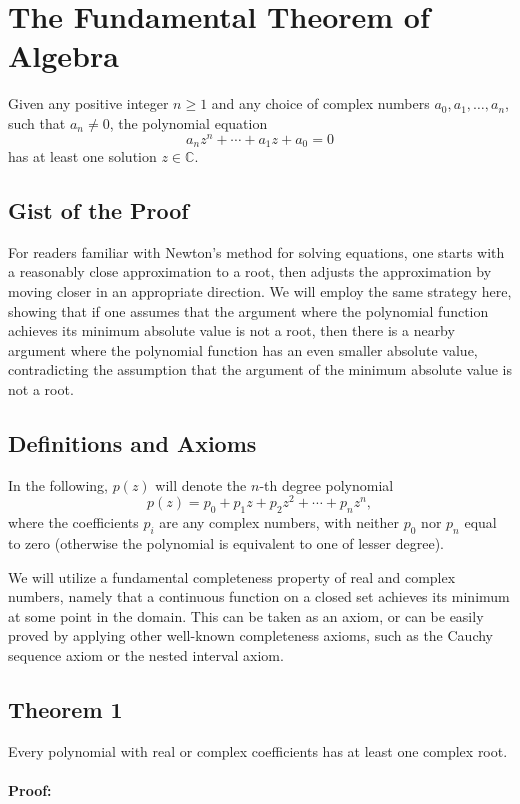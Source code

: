 \newpage
\section{The Fundamental Theorem of Algebra}

Given any positive integer \(n \geq 1\) and any choice of complex numbers \(a_0, a_1, \ldots, a_n\), such that \(a_n \neq 0\), the polynomial equation
\[
	a_n z^n + \cdots + a_1 z + a_0 = 0 \tag{1}
\]
has at least one solution \(z \in \mathbb{C}\).

\subsection*{Gist of the Proof}

For readers familiar with Newton’s method for solving equations, one starts with a reasonably close approximation to a root, then adjusts the approximation by moving closer in an appropriate direction. We will employ the same strategy here, showing that if one assumes that the argument where the polynomial function achieves its minimum absolute value is not a root, then there is a nearby argument where the polynomial function has an even smaller absolute value, contradicting the assumption that the argument of the minimum absolute value is not a root.

\subsection{Definitions and Axioms}
In the following, \(p(z)\) will denote the \(n\)-th degree polynomial
\[
	p(z) = p_0 + p_1 z + p_2 z^2 + \cdots + p_n z^n,
\]
where the coefficients \(p_i\) are any complex numbers, with neither \(p_0\) nor \(p_n\) equal to zero (otherwise the polynomial is equivalent to one of lesser degree).

We will utilize a fundamental completeness property of real and complex numbers, namely that a continuous function on a closed set achieves its minimum at some point in the domain. This can be taken as an axiom, or can be easily proved by applying other well-known completeness axioms, such as the Cauchy sequence axiom or the nested interval axiom.

\subsection{Theorem 1}
Every polynomial with real or complex coefficients has at least one complex root.
\\\\
\textbf{Proof:}

